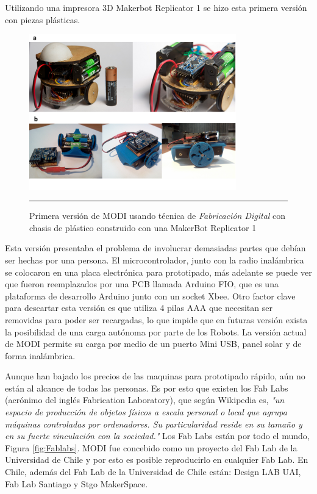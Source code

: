 Utilizando una impresora 3D Makerbot Replicator 1 se hizo esta primera versión con piezas plásticas.

\begin{figure}[htbp]
	\centering
		\includegraphics[width=0.8\textwidth]{./Pictures/modi_analogToDigital.png}
		\rule{35em}{0.5pt}
	\caption[modireplicator]{Primera versión de MODI usando técnica de \emph{ Fabricación Digital }con chasis de plástico construido con una MakerBot Replicator 1}
	\label{fig:modireplicator}
\end{figure}

Esta versión presentaba el problema de involucrar demasiadas partes que debían ser hechas por una persona. El microcontrolador, junto con la radio inalámbrica se colocaron en una placa electrónica para prototipado, más adelante se puede ver que fueron reemplazados por una PCB llamada Arduino FIO, que es una plataforma de desarrollo Arduino junto con un socket Xbee. Otro factor clave para descartar esta versión es que utiliza 4 pilas AAA que necesitan ser removidas para poder ser recargadas, lo que impide que en futuras versión exista la posibilidad de una carga autónoma por parte de los Robots. La versión actual de MODI permite su carga por medio de un puerto Mini USB, panel solar y de forma inalámbrica.

Aunque han bajado los precios de las maquinas para prototipado rápido, aún no están al alcance de todas las personas. Es por esto que existen los Fab Labs (acrónimo del inglés Fabrication Laboratory), que según Wikipedia es, \textit{"un espacio de producción de objetos físicos a escala personal o local que agrupa máquinas controladas por ordenadores. Su particularidad reside en su tamaño y en su fuerte vinculación con la sociedad."} Los Fab Labs están por todo el mundo, Figura \ref{fig:Fablabs}. MODI fue concebido como un proyecto del Fab Lab de la Universidad de Chile y por esto es posible reproducirlo en cualquier Fab Lab. En Chile, además del Fab Lab de la Universidad de Chile están: Design LAB UAI, Fab Lab Santiago y Stgo MakerSpace. 

